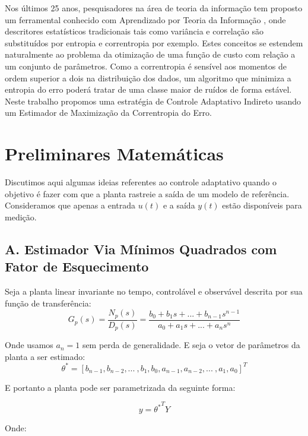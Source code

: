 \documentclass[conference,harvard,brazil,english]{sbatex}
\begin{document}
Nos últimos 25 anos, pesquisadores na área de teoria da informação tem proposto um ferramental conhecido com Aprendizado por Teoria da Informação \cite{principebook}, onde descritores estatísticos tradicionais tais como variância e correlação são substituídos por entropia e correntropia por exemplo. Estes conceitos se estendem naturalmente ao problema da otimização de uma função de custo com relação a um conjunto de parâmetros. Como a correntropia é sensível aos momentos de ordem superior a dois na distribuição dos dados, um algoritmo que minimiza a entropia do erro poderá tratar de uma classe maior de ruídos de forma estável. Neste trabalho propomos uma estratégia de Controle Adaptativo Indireto usando um Estimador de Maximização da Correntropia do Erro.


\section{Preliminares Matemáticas}

Discutimos aqui algumas ideias referentes ao controle adaptativo quando o objetivo é fazer com que a planta rastreie a saída de um modelo de referência. Consideramos que apenas a entrada $u(t)$ e a saída $y(t)$ estão disponíveis para medição.

\subsection*{A. Estimador Via Mínimos Quadrados com Fator de Esquecimento}

Seja a planta linear invariante no tempo, controlável e observável descrita por sua função de transferência:
\begin{equation}
G_p(s) = \frac{N_p(s)}{D_p(s)} = \frac{b_0 + b_1 s + ... + b_{n-1} s^{n-1}}{a_0 + a_1 s+ ... + a_n s^n}
\end{equation}

Onde usamos $a_n = 1$ sem perda de generalidade. E seja o vetor de parâmetros da planta a ser estimado:
\begin{equation*}
\theta^* = [b_{n-1}, b_{n-2}, ...~ , b_1, b_0, a_{n-1}, a_{n-2}, ...~ , a_1, a_0]^T
\end{equation*}

E portanto a planta pode ser parametrizada da seguinte forma:

\begin{equation}
y = {\theta^*}^T Y
\end{equation}

Onde:
\end{document}
